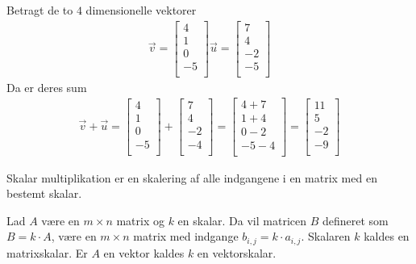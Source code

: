 \begin{eks}
Betragt de to $4$ dimensionelle vektorer
\begin{align*}
\vec{v}=
\begin{bmatrix}
4\\
1\\
0\\
-5\\
\end{bmatrix}
\vec{u}=
\begin{bmatrix}
7\\
4\\
-2\\
-5\\
\end{bmatrix}
\end{align*}
Da er deres sum 
\begin{align*}
\vec{v}+\vec{u}=
\begin{bmatrix}
4\\
1\\
0\\
-5\\
\end{bmatrix}
+
\begin{bmatrix}
7\\
4\\
-2\\
-4\\
\end{bmatrix}
=
\begin{bmatrix}
4+7\\
1+4\\
0-2\\
-5-4\\
\end{bmatrix}
=
\begin{bmatrix}
11\\
5\\
-2\\
-9\\
\end{bmatrix}
\end{align*}
\end{eks}

Skalar multiplikation er en skalering af alle indgangene i en matrix med en bestemt skalar.


\begin{defn}[Matrixskalar]
Lad $A$ være en $m \times n$ matrix og $k$ en skalar. Da vil matricen $B$ defineret som $B=k \cdot A$, være en $m \times n$ matrix med indgange $b_{i,j}=k\cdot a_{i,j}$. Skalaren $k$ kaldes en matrixskalar. Er $A$ en vektor kaldes $k$ en vektorskalar.
\end{defn}

